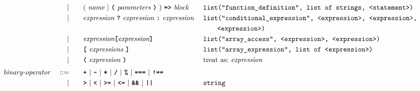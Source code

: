 \begin{alignat*}{9}
&&                       && |   &\quad &&   (\ \textit{name}\ | \
                                               \textbf{\texttt{(}}\ \textit{parameters}\ \textbf{\texttt{)}}\
                                            )\    
                                            \texttt{\textbf{=>}}\ \textit{block}
                                                           && \texttt{list("function\_definition", list of strings, <statement>)} \\
&&                       && |   &\quad &&   \textit{expression} \ \textbf{\texttt{?}}\ 
                                            \textit{expression}
                                            \ \textbf{\texttt{:}}\
                                            \textit{expression}\
                                                           && \texttt{list("conditional\_expression", <expression>, <expression>,} \\
                                            &&&&&&&&&\ \ \ \ \ \ \texttt{<expression>)} \\
&&                       && |   &\quad && \textit{expression} \textbf{\texttt{[}}
                                          \textit{expression} \textbf{\texttt{]}}
                                                           && \texttt{list("array\_access", <expression>, <expression>)} \\
&&                       && |   &\quad &&   \textbf{\texttt{[}}\ 
                                            \textit{expressions}\
                                            \textbf{\texttt{]}}
                                                           && \texttt{list("array\_expression", list of <expression>)} \\
&&                       && |   &\quad &&  \textbf{\texttt{(}}\  \textit{expression} \ 
                                            \textbf{\texttt{)}} && \textrm{treat as:}\ \textit{expression} \\[1mm]
&& \textit{binary-operator}    \ 
                        && ::= &\quad && \textbf{\texttt{+}}\ |\ \textbf{\texttt{-}}\ |\ \textbf{\texttt{*}}\ |\ \textbf{\texttt{/}}\ |\ \textbf{\texttt{\%}}\ |\ 
                                   \textbf{\texttt{===}}\ |\ \textbf{\texttt{!==}}\ \\
&&                       && |  &\quad &&  \texttt{\textbf{>}}\ |\ \texttt{\textbf{<}}\ |\ \texttt{\textbf{>=}}\ |\ \texttt{\textbf{<=}}\
                                          |\ \textbf{\texttt{\&\&}}\ |\ \texttt{\textbf{||}}
                                          && \texttt{string} \\[1mm]

\end{alignat*}
